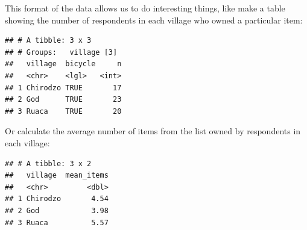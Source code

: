 \documentclass[]{book}
\newenvironment{Shaded}{\begin{snugshade}}{\end{snugshade}}
\newcommand{\KeywordTok}[1]{\textcolor[rgb]{0.13,0.29,0.53}{\textbf{#1}}}
\newcommand{\DataTypeTok}[1]{\textcolor[rgb]{0.13,0.29,0.53}{#1}}
\newcommand{\StringTok}[1]{\textcolor[rgb]{0.31,0.60,0.02}{#1}}
\newcommand{\OperatorTok}[1]{\textcolor[rgb]{0.81,0.36,0.00}{\textbf{#1}}}
\newcommand{\NormalTok}[1]{#1}
\begin{document}
This format of the data allows us to do interesting things, like make a
table showing the number of respondents in each village who owned a
particular item:

\begin{Shaded}
\end{Shaded}

\begin{verbatim}
## # A tibble: 3 x 3
## # Groups:   village [3]
##   village  bicycle     n
##   <chr>    <lgl>   <int>
## 1 Chirodzo TRUE       17
## 2 God      TRUE       23
## 3 Ruaca    TRUE       20
\end{verbatim}

Or calculate the average number of items from the list owned by
respondents in each village:

\begin{Shaded}
\end{Shaded}

\begin{verbatim}
## # A tibble: 3 x 2
##   village  mean_items
##   <chr>         <dbl>
## 1 Chirodzo       4.54
## 2 God            3.98
## 3 Ruaca          5.57
\end{verbatim}
\end{document}
